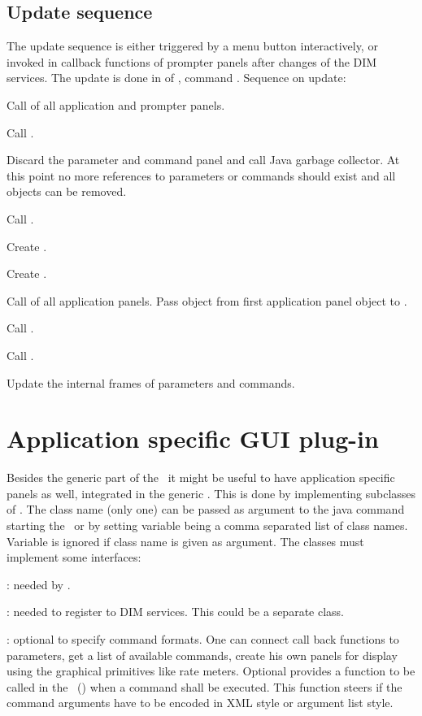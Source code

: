 \subsection{Update sequence}
The update sequence is either triggered by a menu button interactively, or invoked
in callback functions of prompter panels
after changes of the DIM services.
The update is done in  of , command .
Sequence on update:
\bnum
\item Call  of all application and prompter panels.
\item Call .
\item Discard the parameter and command panel and call Java garbage collector.
At this point no more references to parameters or commands should exist and
all objects can be removed.
\item Call .
\item Create .
\item Create .
\item Call  of all application panels. Pass
 object from first application panel object to .
\item Call . 
\item Call .
\item Update the internal frames of parameters and commands.
\enum 

\section{Application specific GUI plug-in}
Besides the generic part of the \gui\ it might be useful to have application specific panels as well, integrated in the generic \gui. This is done by implementing subclasses of  . The class name (only one) can be passed as argument to the java command starting the \gui\ or by setting variable  being a comma separated list of class names.
Variable is ignored if class name is given as argument.
The classes must implement some interfaces:
\bdes
\item [\class{xiUserPanel}]: needed by \gui.
\item [\class{xiUserInfoHandler}]: needed to register to DIM services. This could be a separate
class.
\item [\class{xiUserCommand}]: optional to specify command formats.
\edes
One can connect call back functions to parameters, 
get a list of available commands,
create his own panels for display using the graphical primitives like rate meters.
Optional  provides a function to be called in the \gui\ 
() when a command shall be executed. This function steers if the command arguments have to be
encoded in XML style or argument list style.


